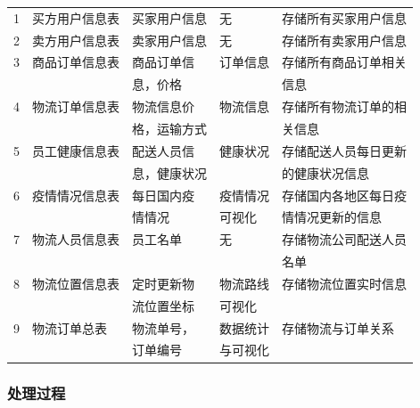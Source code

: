 \documentclass[12pt]{article}
\begin{document}
\begin{center}
\begin{supertabular}{lllll}
	1 &	买方用户信息表 &	买家用户信息 	& 无 &	存储所有买家用户信息 \\
	2 &	卖方用户信息表 &	卖家用户信息 &	无 &	存储所有卖家用户信息 \\
	3 &	商品订单信息表 &	商品订单信 &	订单信息 &	存储所有商品订单相关 \\ && 息，价格 && 信息 \\ 
	4 &	物流订单信息表 &	物流信息价 &	物流信息 &	存储所有物流订单的相 \\ && 格，运输方式 && 关信息 \\
	5 &	员工健康信息表 &	配送人员信 &	健康状况 &	存储配送人员每日更新 \\ && 息，健康状况 && 的健康状况信息 \\
	6 &	疫情情况信息表 &	每日国内疫 &	疫情情况 &	存储国内各地区每日疫 \\ && 情情况 & 可视化 & 情情况更新的信息 \\
	7 &	物流人员信息表 &	员工名单 &	无 &	存储物流公司配送人员 \\ &&&& 名单 \\
	8 & 物流位置信息表 &	定时更新物 &	物流路线 &	存储物流位置实时信息 \\ && 流位置坐标 & 可视化 & \\
	9 & 物流订单总表 & 物流单号，& 数据统计 & 存储物流与订单关系\\ && 订单编号 & 与可视化 & \\
\end{supertabular}
\end{center}

\subsubsection{处理过程}

\tabletail{\bottomrule}
\end{document}
